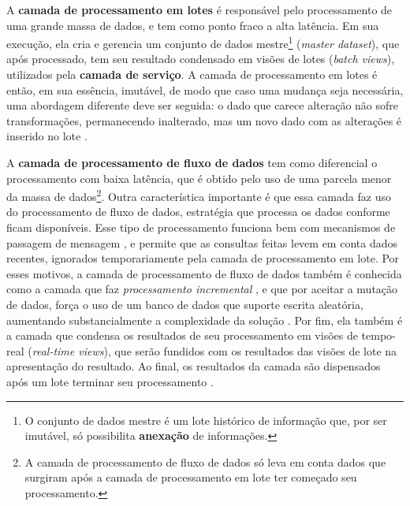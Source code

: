 A \textbf{camada de processamento em lotes} é responsável pelo processamento de uma grande
massa de dados, e tem como ponto fraco a alta latência. Em sua execução, ela
cria e gerencia um conjunto de dados mestre\footnote{O conjunto de dados mestre
é um lote histórico de informação que, por ser imutável, só possibilita
\textbf{anexação} de informações.} (\textit{master dataset}), que após processado,
tem seu resultado condensado em visões de lotes (\textit{batch views}),
utilizados pela \textbf{camada de serviço}.  A camada de processamento em lotes
é então, em sua essência, imutável, de modo que caso uma mudança seja necessária,
uma abordagem diferente deve ser seguida: o dado que carece alteração não sofre
transformações, permanecendo inalterado, mas um novo dado com as alterações é
inserido no lote \cite{marz2015}.

A \textbf{camada de processamento de fluxo de dados} tem como diferencial o
processamento com baixa latência, que é obtido pelo uso de uma parcela menor da
massa de dados\footnote{A camada de processamento de fluxo de dados só leva em
conta dados que surgiram após a camada de processamento em lote ter começado seu
processamento.}. Outra característica importante
é que essa camada faz uso do processamento de fluxo de dados, estratégia que
processa os dados conforme ficam disponíveis. Esse tipo de
processamento funciona bem com mecanismos de passagem de mensagem
\cite{marz2015}, e permite que as consultas feitas levem em conta dados
recentes, ignorados temporariamente pela camada de processamento em lote. Por esses
motivos, a camada de processamento de fluxo de dados também é conhecida como a
camada que faz \textit{processamento incremental} \cite{marz2015}, e que por aceitar a mutação
de dados, força o uso de um banco de dados que suporte escrita aleatória,
aumentando substancialmente a complexidade da solução \cite{marz2015}. Por
fim, ela também é a camada que condensa os resultados de seu processamento em
visões de tempo-real (\textit{real-time views}), que serão fundidos com os resultados das
visões de lote na apresentação do resultado. Ao final, os resultados
da camada são dispensados após um lote terminar seu processamento \cite{marz2015}.

